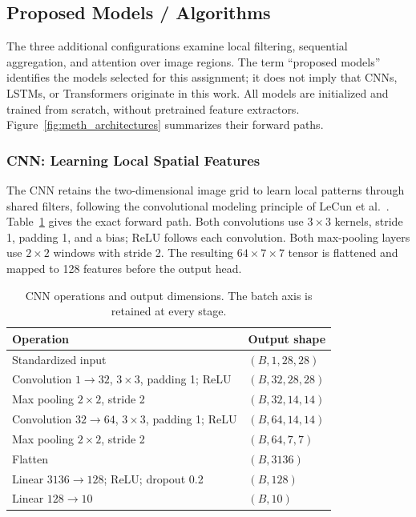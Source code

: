 \subsection{Proposed Models / Algorithms}
\label{sec:meth_models}
The three additional configurations examine local filtering, sequential
aggregation, and attention over image regions. The term ``proposed models''
identifies the models selected for this assignment; it does not imply that
CNNs, LSTMs, or Transformers originate in this work. All models are initialized
and trained from scratch, without pretrained feature extractors.
Figure~\ref{fig:meth_architectures} summarizes their forward paths.

\subsubsection{CNN: Learning Local Spatial Features}
The CNN retains the two-dimensional image grid to learn local patterns through
shared filters, following the convolutional modeling principle of
LeCun et al.~\cite{meth_lecun}. Table~\ref{tab:meth_cnn} gives the exact
forward path. Both convolutions use $3\times3$ kernels, stride 1, padding 1,
and a bias; ReLU follows each convolution. Both max-pooling layers use
$2\times2$ windows with stride 2. The resulting $64\times7\times7$ tensor is
flattened and mapped to 128 features before the output head.

\begin{table}[H]\centering
\caption{CNN operations and output dimensions. The batch axis is retained at
every stage.}\label{tab:meth_cnn}
\begin{tabularx}{\linewidth}{X l}\toprule
Operation & Output shape\\\midrule
Standardized input & $(B,1,28,28)$\\
Convolution $1\to32$, $3\times3$, padding 1; ReLU & $(B,32,28,28)$\\
Max pooling $2\times2$, stride 2 & $(B,32,14,14)$\\
Convolution $32\to64$, $3\times3$, padding 1; ReLU & $(B,64,14,14)$\\
Max pooling $2\times2$, stride 2 & $(B,64,7,7)$\\
Flatten & $(B,3136)$\\
Linear $3136\to128$; ReLU; dropout 0.2 & $(B,128)$\\
Linear $128\to10$ & $(B,10)$\\\bottomrule
\end{tabularx}\end{table}

